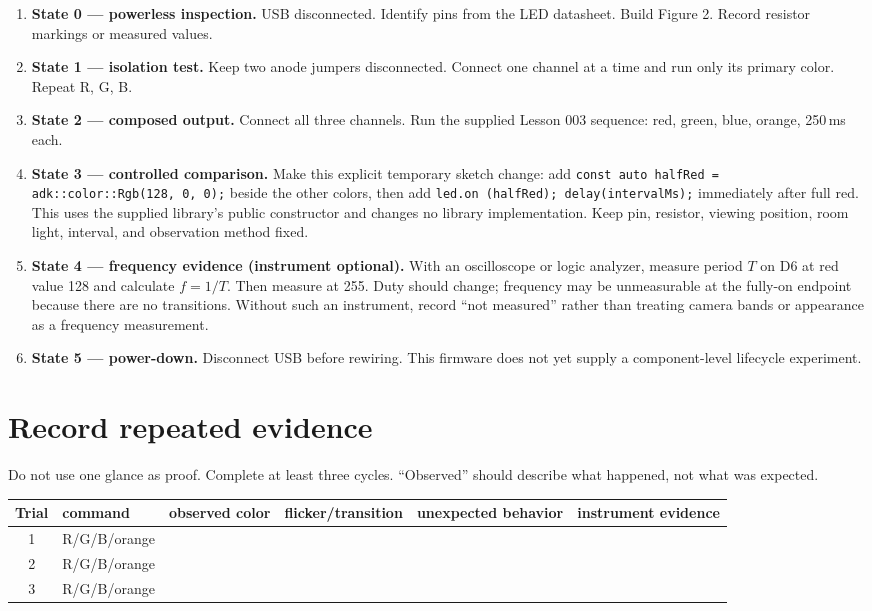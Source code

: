 \documentclass[11pt]{article}
\newcommand{\state}[1]{\textbf{State #1}}
\begin{document}
\begin{enumerate}
  \item \state{0 --- powerless inspection.} USB disconnected. Identify pins from the
        LED datasheet. Build Figure 2. Record resistor markings or measured values.
  \item \state{1 --- isolation test.} Keep two anode jumpers disconnected. Connect
        one channel at a time and run only its primary color. Repeat R, G, B.
  \item \state{2 --- composed output.} Connect all three channels. Run the supplied
        Lesson 003 sequence: red, green, blue, orange, 250\,ms each.
  \item \state{3 --- controlled comparison.} Make this explicit temporary sketch
        change: add
        \texttt{const auto halfRed = adk::color::Rgb(128, 0, 0);} beside the other
        colors, then add \texttt{led.on (halfRed); delay(intervalMs);} immediately
        after full red. This uses the supplied library's public constructor and
        changes no library implementation. Keep pin, resistor, viewing position,
        room light, interval, and observation method fixed.
  \item \state{4 --- frequency evidence (instrument optional).} With an oscilloscope
        or logic analyzer, measure period \(T\) on D6 at red value 128 and calculate
        \(f=1/T\). Then measure at 255. Duty should change; frequency may be
        unmeasurable at the fully-on endpoint because there are no transitions.
        Without such an instrument, record ``not measured'' rather than treating
        camera bands or appearance as a frequency measurement.
  \item \state{5 --- power-down.} Disconnect USB before rewiring. This firmware does
        not yet supply a component-level lifecycle experiment.
\end{enumerate}

\section*{Record repeated evidence}
Do not use one glance as proof. Complete at least three cycles. ``Observed'' should
describe what happened, not what was expected.

\begin{center}
\small
\begin{tabular}{@{}clp{2.7cm}p{2.8cm}p{2.8cm}p{2.5cm}@{}}
\toprule
Trial & command & observed color & flicker/transition & unexpected behavior &
instrument evidence\\
\midrule
1 & R/G/B/orange & & & &\\[8mm]
2 & R/G/B/orange & & & &\\[8mm]
3 & R/G/B/orange & & & &\\[8mm]
\bottomrule
\end{tabular}
\end{center}
\end{document}
